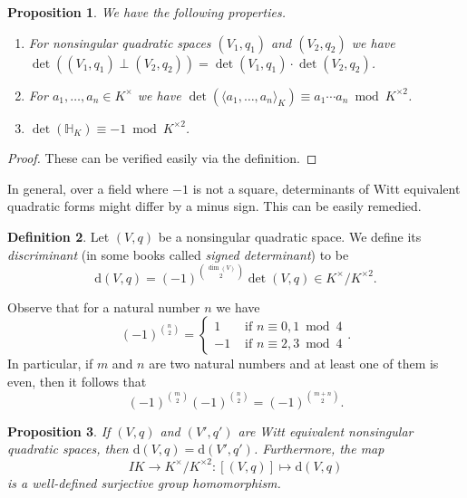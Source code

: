 \documentclass[12pt, leqno, british]{amsart}
\theoremstyle{definition}
\newtheorem{defi}{Definition}[subsection]
\theoremstyle{plain}
\newtheorem{prop}[defi]{Proposition}
\theoremstyle{remark}
\newcommand{\mbb}{\mathbb}
\newcommand{\disc}{\mathrm{d}}
\begin{document}
\begin{prop}\label{P:det-computation-rules}
We have the following properties.
\begin{enumerate}
\item For nonsingular quadratic spaces $(V_1, q_1)$ and $(V_2, q_2)$ we have $\det ((V_1, q_1) \perp (V_2, q_2)) = \det(V_1, q_1) \cdot \det(V_2, q_2)$.
\item For $a_1, \ldots, a_n \in K^\times$ we have $\det(\langle a_1, \ldots, a_n \rangle_K) \equiv a_1 \cdots a_n \bmod K^{\times 2}$.
\item $\det(\mbb{H}_K) \equiv -1 \bmod K^{\times 2}$.
\end{enumerate}
\end{prop}
\begin{proof}
These can be verified easily via the definition.
\end{proof}
In general, over a field where $-1$ is not a square, determinants of Witt equivalent quadratic forms might differ by a minus sign.
This can be easily remedied.
\begin{defi}
Let $(V, q)$ be a nonsingular quadratic space.
We define its \emph{discriminant} (in some books called \emph{signed determinant}) to be
$$ \disc(V, q) = (-1)^{\binom{\dim(V)}{2}} \det(V, q) \in K^\times/K^{\times 2}.$$
\end{defi}
Observe that for a natural number $n$ we have
\begin{equation*}\label{E:binom}
(-1)^{\binom{n}{2}} = \begin{cases}
1 &\text{ if } n \equiv 0, 1 \bmod 4 \\
-1 &\text{ if } n \equiv 2, 3 \bmod 4
\end{cases}.
\end{equation*}
In particular, if $m$ and $n$ are two natural numbers and at least one of them is even, then it follows that
\begin{equation}\label{E:binom2}
(-1)^{\binom{m}{2}}(-1)^{\binom{n}{2}} = (-1)^{\binom{m+n}{2}}.
\end{equation}
\begin{prop}\label{P:disc-map}
If $(V, q)$ and $(V', q')$ are Witt equivalent nonsingular quadratic spaces, then $\disc(V, q) = \disc(V', q')$.
Furthermore, the map
$$ IK \to K^\times/K^{\times 2} : [(V, q)] \mapsto \disc(V, q) $$
is a well-defined surjective group homomorphism.
\end{prop}
\end{document}
